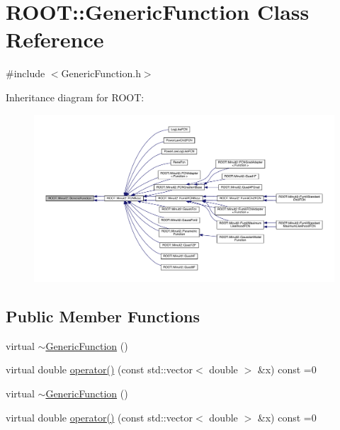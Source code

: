 \hypertarget{classROOT_1_1Minuit2_1_1GenericFunction}{}\section{R\+O\+OT\+:\+:Generic\+Function Class Reference}
\label{classROOT_1_1Minuit2_1_1GenericFunction}


{\ttfamily \#include $<$Generic\+Function.\+h$>$}



Inheritance diagram for R\+O\+OT\+:\nopagebreak
\begin{figure}[H]
\begin{center}
\leavevmode
\includegraphics[width=350pt]{de/d50/classROOT_1_1Minuit2_1_1GenericFunction__inherit__graph}
\end{center}
\end{figure}
\subsection*{Public Member Functions}
\begin{DoxyCompactItemize}
\item 
virtual \mbox{\hyperlink{classROOT_1_1Minuit2_1_1GenericFunction_ac1d198b822e43d3936286cc580c3e035}{$\sim$\+Generic\+Function}} ()
\item 
virtual double \mbox{\hyperlink{classROOT_1_1Minuit2_1_1GenericFunction_a0d6039ad9aa18e475534d1fd80342e9d}{operator()}} (const std\+::vector$<$ double $>$ \&x) const =0
\item 
virtual \mbox{\hyperlink{classROOT_1_1Minuit2_1_1GenericFunction_ac1d198b822e43d3936286cc580c3e035}{$\sim$\+Generic\+Function}} ()
\item 
virtual double \mbox{\hyperlink{classROOT_1_1Minuit2_1_1GenericFunction_a0d6039ad9aa18e475534d1fd80342e9d}{operator()}} (const std\+::vector$<$ double $>$ \&x) const =0
\end{DoxyCompactItemize}


